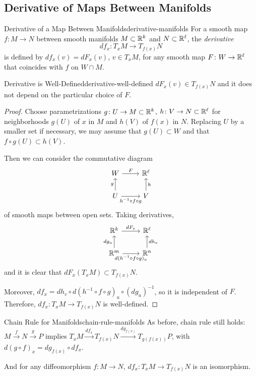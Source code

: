 \subsection{Derivative of Maps Between Manifolds}

\begin{definition}{Derivative of a Map Between Manifolds}{derivative-manifolds}
    For a smooth map $f \colon M \to N$ between smooth manifolds $M \subset \mathbb{R}^k$ and $N \subset \mathbb{R}^\ell$, the \emph{derivative}
    \[
        df_x \colon T_x M \to T_{f(x)} N
    \]
    is defined by $df_x(v) = dF_x(v)$, $v \in T_x M$, for any smooth map $F \colon W \to \mathbb{R}^\ell$ that coincides with $f$ on $W \cap M$.
\end{definition}

\begin{proposition}{Derivative is Well-Defined}{derivative-well-defined}
    $dF_x(v) \in T_{f(x)} N$ and it does not depend on the particular choice of $F$.
\end{proposition}

\begin{proof}
    Choose parametrizations $g \colon U \to M \subset \mathbb{R}^k$, $h \colon V \to N \subset \mathbb{R}^\ell$ for neighborhoods $g(U)$ of $x$ in $M$ and $h(V)$ of $f(x)$ in $N$. Replacing $U$ by a smaller set if necessary, we may assume that $g(U) \subset W$ and that $f \circ g(U) \subset h(V)$.

    Then we can consider the commutative diagram
    \[
    \begin{tikzcd}
        W \arrow[r, "F"] & \R^\ell \\
        U \arrow[u, "g"] \arrow[r, "h^{-1} \circ f \circ g"'] & V \arrow[u, "h"']
    \end{tikzcd}
    \]
    of smooth maps between open sets. Taking derivatives,
    \[
    \begin{tikzcd}
        \R^k \arrow[r, "dF_x"] & \R^\ell \\
        \R^m \arrow[u, "dg_u"] \arrow[r, "d(h^{-1} \circ f \circ g)_u"'] & \R^n \arrow[u, "dh_v"']
    \end{tikzcd}
    \]
    and it is clear that $dF_x(T_x M) \subset T_{f(x)} N$.

    Moreover, $df_x = dh_v \circ d(h^{-1} \circ f \circ g)_u \circ (dg_u)^{-1}$, so it is independent of $F$. Therefore, $df_x \colon T_x M \to T_{f(x)} N$ is well-defined.
\end{proof}

\begin{remark}{Chain Rule for Manifolds}{chain-rule-manifolds}
    As before, chain rule still holds: $M \xrightarrow{f} N \xrightarrow{g} P$ implies $T_x M \xrightarrow{df_x} T_{f(x)} N \xrightarrow{dg_{f(x)}} T_{g(f(x))} P$, with $d(g \circ f)_x = dg_{f(x)} \circ df_x$.

    And for any diffeomorphism $f \colon M \to N$, $df_x \colon T_x M \to T_{f(x)} N$ is an isomorphism.
\end{remark}
